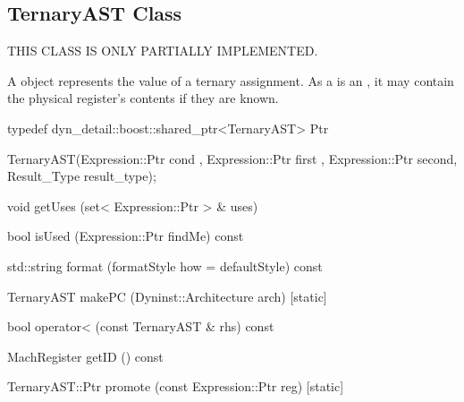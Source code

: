\subsection{TernaryAST Class}
\label{sec:TernaryAST}

THIS CLASS IS ONLY PARTIALLY IMPLEMENTED.


A  object represents the value of a ternary assignment. As a 
is an , it may contain the physical register's contents if they
are known.

\begin{apient}
  typedef dyn\_detail::boost::shared\_ptr<TernaryAST> Ptr
\end{apient}

\begin{apient}
  TernaryAST(Expression::Ptr cond , Expression::Ptr first , Expression::Ptr second, Result_Type result_type);
\end{apient}

\begin{apient}
  void getUses (set< Expression::Ptr > & uses)
\end{apient}

\begin{apient}
  bool isUsed (Expression::Ptr findMe) const
\end{apient}

\begin{apient}
  std::string format (formatStyle how = defaultStyle) const
\end{apient}

\begin{apient}
  TernaryAST makePC (Dyninst::Architecture arch) [static]
\end{apient}

\begin{apient}
  bool operator< (const TernaryAST & rhs) const
\end{apient}

\begin{apient}
  MachRegister getID () const
\end{apient}

\begin{apient}
  TernaryAST::Ptr promote (const Expression::Ptr reg) [static]
\end{apient}

